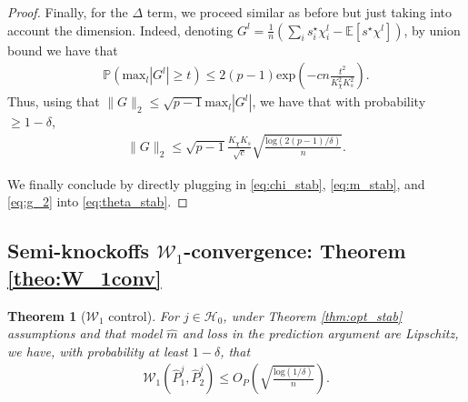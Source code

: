 \documentclass{article}
\theoremstyle{plain}
\newtheorem{theorem}{Theorem}[section]
\theoremstyle{definition}
\theoremstyle{remark}
\newcommand{\e}[1]{\mathbb{E}\left[#1\right]  } %
\newcommand{\prob}[1]{\mathbb{P}\left(#1\right)} %
\begin{document}
\begin{proof}
Finally, for the $\Delta$ term, we proceed similar as before but just taking into account the dimension. Indeed, denoting $G^l=\frac{1}{n}(\sum_i s_i^\star \chi_i^l-\e{s^\star \chi^l})$, by union bound we have that 
\begin{align*}
    \prob{\mathrm{max}_l|G^l|\geq t }\leq 2(p-1)\mathrm{exp}\left(-cn\frac{t^2}{K_\chi^2 K_s^2}\right).
\end{align*}
Thus, using that $\|G\|_2\leq \sqrt{p-1}\mathrm{max}_l |G^l|$, we have that with probability $\geq 1-\delta$, 
\begin{align}
    \|G\|_2\leq \sqrt{p-1}\frac{K_\chi K_s}{\sqrt{c}}\sqrt{\frac{\mathrm{log}(2(p-1)/\delta)}{n}}.\label{eq:g_2}
\end{align}


We finally conclude by directly plugging in \eqref{eq:chi_stab}, \eqref{eq:m_stab}, and \eqref{eq:g_2} into \eqref{eq:theta_stab}.

 \end{proof}
 




\subsection{Semi-knockoffs $\mathcal{W}_1$-convergence: Theorem \ref{theo:W_1conv}}
\begin{theorem}[$\mathcal{W}_1$ control]
 For $j \in \mathcal{H}_0$, under Theorem \ref{thm:opt_stab} assumptions and that model $\widehat{m}$ and loss in the prediction argument are Lipschitz, we have, with probability at least $1-\delta$, that
 \begin{align*}
     \mathcal{W}_1(\hat{P}_1^j, \hat{P}_2^j)\leq O_P\left(\sqrt{\frac{\mathrm{log}(1/\delta)}{n}}\right).
 \end{align*}
 \end{theorem}
 
\end{document}
